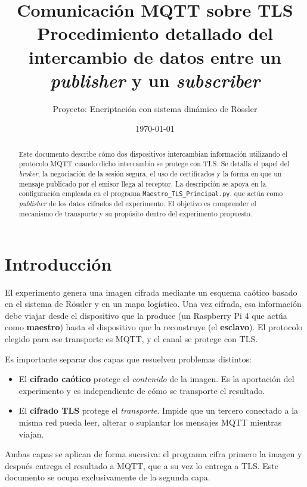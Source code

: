 \documentclass[12pt,a4paper]{article}
\title{\textbf{Comunicación MQTT sobre TLS}\\[0.3cm]
\large Procedimiento detallado del intercambio de datos entre un \textit{publisher} y un \textit{subscriber}}
\author{Proyecto: Encriptación con sistema dinámico de Rössler}
\date{\today}
\begin{document}
\maketitle

\begin{abstract}
\noindent
Este documento describe cómo dos dispositivos intercambian información utilizando el protocolo MQTT cuando dicho intercambio se protege con TLS. Se detalla el papel del \textit{broker}, la negociación de la sesión segura, el uso de certificados y la forma en que un mensaje publicado por el emisor llega al receptor. La descripción se apoya en la configuración empleada en el programa \texttt{Maestro\_TLS\_Principal.py}, que actúa como \textit{publisher} de los datos cifrados del experimento. El objetivo es comprender el mecanismo de transporte y su propósito dentro del experimento propuesto.
\end{abstract}

\tableofcontents
\newpage

\section{Introducción}

El experimento genera una imagen cifrada mediante un esquema caótico basado en el sistema de Rössler y en un mapa logístico. Una vez cifrada, esa información debe viajar desde el dispositivo que la produce (un Raspberry Pi 4 que actúa como \textbf{maestro}) hasta el dispositivo que la reconstruye (el \textbf{esclavo}). El protocolo elegido para ese transporte es MQTT, y el canal se protege con TLS.

Es importante separar dos capas que resuelven problemas distintos:

\begin{itemize}[leftmargin=1.4cm]
	\item El \textbf{cifrado caótico} protege el \textit{contenido} de la imagen. Es la aportación del experimento y es independiente de cómo se transporte el resultado.
	\item El \textbf{cifrado TLS} protege el \textit{transporte}. Impide que un tercero conectado a la misma red pueda leer, alterar o suplantar los mensajes MQTT mientras viajan.
\end{itemize}

Ambas capas se aplican de forma sucesiva: el programa cifra primero la imagen y después entrega el resultado a MQTT, que a su vez lo entrega a TLS. Este documento se ocupa exclusivamente de la segunda capa.
\end{document}
